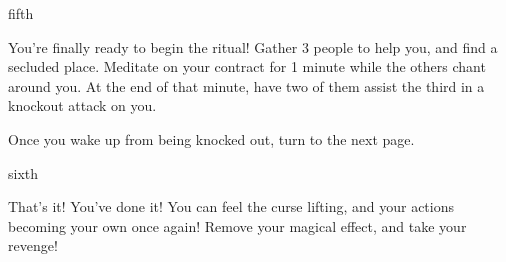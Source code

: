 \documentclass[greennotebook]{NeptuneBall}
\begin{document}
\begin{page}{fifth}

You're finally ready to begin the ritual! Gather 3 people to help you, and find a secluded place. Meditate on your contract for 1 minute while the others chant around you. At the end of that minute, have two of them assist the third in a knockout attack on you.

Once you wake up from being knocked out, turn to the next page.

\end{page}

\begin{page}{sixth}

That's it! You've done it! You can feel the curse lifting, and your actions becoming your own once again! Remove your \iIdentityProtectionSpell{} magical effect, and take your revenge!

\end{page}

\endnotebook
\end{document}
